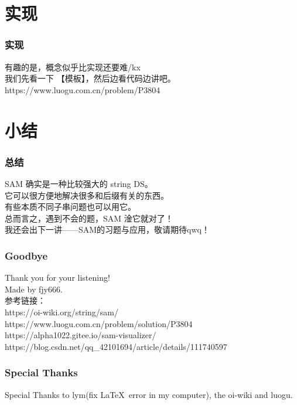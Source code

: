 \documentclass{beamer}
\begin{document}
    \section{实现}
    
    \begin{frame}
        \frametitle{实现}
        有趣的是，概念似乎比实现还要难/kx\\
        我们先看一下 【模板】，然后边看代码边讲吧。\\
        https://www.luogu.com.cn/problem/P3804
    \end{frame} 

    \section{小结}

    \begin{frame}
        \frametitle{总结}
        SAM 确实是一种比较强大的 string DS。  \\
        它可以很方便地解决很多和后缀有关的东西。\\
        有些本质不同子串问题也可以用它。\\
        总而言之，遇到不会的题，SAM 淦它就对了！\\
        我还会出下一讲——SAM的习题与应用，敬请期待qwq！
    \end{frame}

    \begin{frame}
        \frametitle{Goodbye}
        Thank you for your listening!\\
        Made by fjy666.\\
        参考链接：\\
        https://oi-wiki.org/string/sam/ \\
        https://www.luogu.com.cn/problem/solution/P3804 \\
        https://alpha1022.gitee.io/sam-visualizer/ \\
        https://blog.csdn.net/qq\_42101694/article/details/111740597
    \end{frame}

    \begin{frame}
        \frametitle{Special Thanks}
        Special Thanks to lym(fix \LaTeX\ error in my computer), the oi-wiki and luogu.
    \end{frame}
\end{document}
